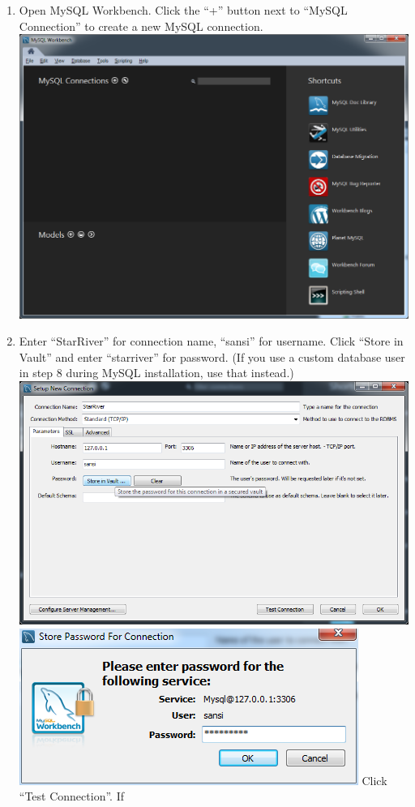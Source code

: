 \begin{enumerate}
\def\labelenumi{\arabic{enumi}.}
\itemsep1pt\parskip0pt
\item
  Open MySQL Workbench. Click the ``+'' button next to ``MySQL
  Connection'' to create a new MySQL connection.
  \includegraphics{../img/db_init_1.png}
\item
  Enter ``StarRiver'' for connection name, ``sansi'' for username. Click
  ``Store in Vault'' and enter ``starriver'' for password. (If you use a
  custom database user in step 8 during MySQL installation, use that
  instead.) \includegraphics{../img/db_init_2.png}
  \includegraphics{../img/db_init_3.png} Click ``Test Connection''. If

\end{enumerate}
